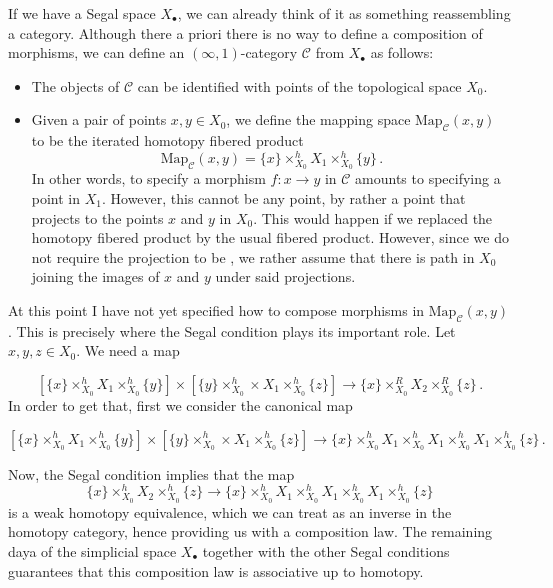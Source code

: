 \documentclass[a4paper,11pt]{article}
\newcommand{\ccal}{\mathcal{C}}
\theoremstyle{plain}
\theoremstyle{definition}
\theoremstyle{remark}
\begin{document}
If we have a Segal space $X_{\bullet}$, we can already think of it as something reassembling a category. Although there a priori there is no way to define a composition of morphisms, we can define an $(\infty, 1)$-category $\ccal$ from $X_{\bullet}$ as follows:

\begin{itemize}
    \item The objects of $\ccal$ can be identified with points of the topological space $X_0$. 
    \item Given a pair of points $x, y \in X_0$, we define the mapping space $\text{Map}_{\ccal}(x,y)$ to be the iterated homotopy fibered product 
    $$\text{Map}_{\ccal}(x,y) = \{x\} \times_{X_0}^h X_1 \times_{X_0}^h \{y\} \, .$$
    In other words, to specify a morphism $f \colon x \to y$ in $\ccal$ amounts to specifying a point in $X_1$. However, this cannot be any point, by rather a point that projects to the points $x$ and $y$ in $X_0$. This would happen if we replaced the homotopy fibered product by the usual fibered product. However, since we do not require the projection to be , we rather assume that there is path in $X_0$ joining the images of $x$ and $y$ under said projections. 
\end{itemize}

At this point I have not yet specified how to compose morphisms in $\text{Map}_{\ccal}(x,y)$. This is precisely where the Segal condition plays its important role. Let $x, y , z \in X_0$. We need a map 

$$\left[ \{x\} \times_{X_0}^h X_1 \times_{X_0}^h \{y\} \right] \times \left[\{y\} \times_{X_0}^h \times X_1 \times_{X_0}^h \{z\} \right] \to \{x\} \times_{X_0}^R X_2 \times_{X_0}^R \{z\} \, .$$
In order to get that, first we consider the canonical map 

$$\left[ \{x\} \times_{X_0}^h X_1 \times_{X_0}^h \{y\} \right] \times \left[\{y\} \times_{X_0}^h \times X_1 \times_{X_0}^h \{z\} \right] \to \{x\} \times_{X_0}^h X_1 \times_{X_0}^h X_1 \times_{X_0}^h X_1 \times_{X_0}^h \{z\} \, .$$

Now, the Segal condition implies that the map 
$$\{x\} \times_{X_0}^h X_2 \times_{X_0}^h \{z\} \to \{x\} \times_{X_0}^h X_1 \times_{X_0}^h X_1 \times_{X_0}^h X_1 \times_{X_0}^h \{z\}$$
is a weak homotopy equivalence, which we can treat as an inverse in the homotopy category, hence providing us with a composition law. The remaining daya of the simplicial space $X_{\bullet}$ together with the other Segal conditions guarantees that this composition law is associative up to homotopy. 
\end{document}
